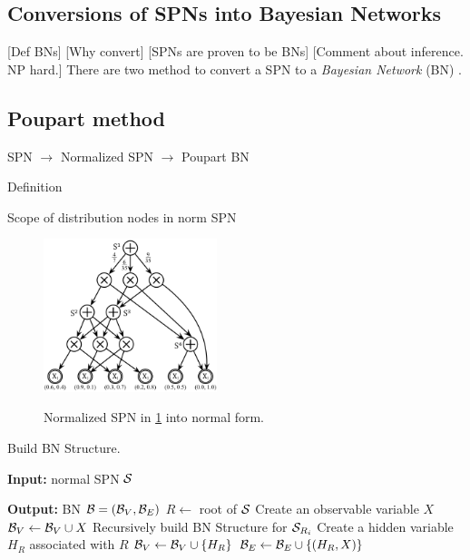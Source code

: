 \subsection{Conversions of SPNs into Bayesian Networks}

[Def BNs]
[Why convert]
[SPNs are proven to be BNs]
[Comment about inference. NP hard.]
There are two method to convert a SPN to a \emph{Bayesian Network} (BN) \cite{pear88}.

\subsection{Poupart method}

SPN $\rightarrow$ Normalized SPN $\rightarrow$ Poupart BN

Definition

Scope of distribution nodes in norm SPN

\begin{figure}[h]
    \begin{center}
		\includegraphics[width=0.45\textwidth]{figures/norm_SPN.png}
		\caption{Normalized SPN in \ref{fig:spn} into normal form.}
		\label{fig:norm_spn}
    \label{fig:spn}
    \end{center}
\end{figure}

\begin{algorithm}[!ht]
    \caption{\cite{zhao2015relationship} Build BN Structure.}
    \label{alg:poupart}
    \begin{algorithmic}[1]
        \item[\textbf{Input:} normal SPN $\cal S$]
        \item[\textbf{Output:} BN ${\cal B} = ({\cal B}_V, {\cal B}_E)$]
		\State $R \leftarrow$ root of ${\cal S}$
			\State Create an observable variable $X$
			\State ${\cal B}_V \leftarrow {\cal B}_V \cup X$
		\Else
					\State Recursively build BN Structure for ${\cal S}_{R_i}$
				\EndIf
			\EndFor
				\State Create a hidden variable $H_R$ associated with $R$
				\State ${\cal B}_V \leftarrow {\cal B}_V \cup \{H_R\}$
					\State ${\cal B}_E \leftarrow {\cal B}_E \cup \{(H_R,X)\}$
				\EndFor
			\EndIf
		\EndIf		
    \end{algorithmic}
\end{algorithm}

